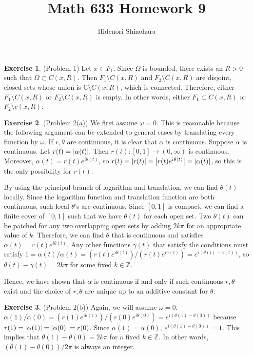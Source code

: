 \documentclass[12pt, psamsfonts]{amsart}
\theoremstyle{definition}
\newtheorem*{exer}{Exercise}
\theoremstyle{remark}
\numberwithin{equation}{section}
\begin{document}
\title{Math 633 Homework 9}
\author{Hidenori Shinohara}
\maketitle

\begin{exer}{(Problem 1)}
  Let $x \in F_1$.
  Since $\Omega$ is bounded, there exists an $R > 0$ such that $\Omega \subset C(x, R)$.
  Then $F_1 \setminus C(x, R)$ and $F_2 \setminus C(x, R)$ are disjoint, closed sets whose union is $\mathbb{C} \setminus C(x, R)$, which is connected.
  Therefore, either $F_1 \setminus C(x, R)$ or $F_2 \setminus C(x, R)$ is empty.
  In other words, either $F_1 \subset C(x, R)$ or $F_2 \setminus c(x, R)$.
\end{exer}

\begin{exer}{(Problem 2(a))}
  We first assume $\omega = 0$.
  This is reasonable because the following argument can be extended to general cases by translating every function by $\omega$.
  If $r, \theta$ are continuous, it is clear that $\alpha$ is continuous.
  Suppose $\alpha$ is continuous.
  Let $r(t) = \abs{\alpha(t)}$.
  Then $r(t):[0, 1] \rightarrow (0, \infty)$ is continuous.
  Moreover, $\alpha(t) = r(t)e^{i\theta(t)}$, so $r(t) = \abs{r(t)} = \abs{r(t)e^{i\theta(t)}} = \abs{\alpha(t)}$, so this is the only possibility for $r(t)$.

  By using the principal branch of logarithm and translation, we can find $\theta(t)$ locally.
  Since the logarithm function and translation function are both continuous, such local $\theta$'s are continuous.
  Since $[0, 1]$ is compact, we can find a finite cover of $[0, 1]$ such that we have $\theta(t)$ for each open set.
  Two $\theta(t)$ can be patched for any two overlapping open sets by adding $2k\pi$ for an appropriate value of $k$.
  Therefore, we can find $\theta$ that is continuous and satisfies $\alpha(t) = r(t)e^{i\theta(t)}$.
  Any other functions $\gamma(t)$ that satisfy the conditions must satisfy $1 = \alpha(t) / \alpha(t) = (r(t)e^{i\theta(t)}) / (r(t)e^{i\gamma(t)}) = e^{i(\theta(t) - \gamma(t))}$, so $\theta(t) - \gamma(t) = 2k\pi$ for some fixed $k \in \mathbb{Z}$.
  
  Hence, we have shown that $\alpha$ is continuous if and only if such continuous $r, \theta$ exist and the choice of $r, \theta$ are unique up to an additive constant for $\theta$.
\end{exer}

\begin{exer}{(Problem 2(b))}
  Again, we will assume $\omega = 0$.
  $\alpha(1) / \alpha(0) = (r(1)e^{i\theta(1)}) / (r(0)e^{i\theta(0)}) = e^{i(\theta(1) - \theta(0))}$ because $r(1) = \abs{\alpha(1)} = \abs{\alpha(0)} = r(0)$.
  Since $\alpha(1) = \alpha(0)$, $e^{i(\theta(1) - \theta(0))} = 1$.
  This implies that $\theta(1) - \theta(0) = 2k\pi$ for a fixed $k \in \mathbb{Z}$.
  In other words, $(\theta(1) - \theta(0)) / 2\pi$ is always an integer.
\end{exer}
\end{document}
